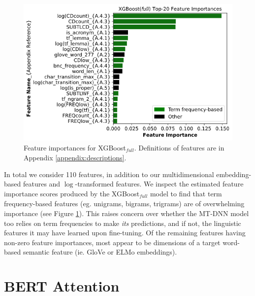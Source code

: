 \documentclass{dcthesis}
\theoremstyle{definition}
\theoremstyle{remark}
\begin{document}
\begin{figure}
  \centering
  \includegraphics[scale=0.6]{xgboost_feature_importances.png}
  \captionsetup{justification=centering}
  \caption{\label{fig:xgboost_feature_importance} Feature importances for XGBoost$_\textit{full}$. Definitions of features are in Appendix \ref{appendix:descriptions}.}
\end{figure}

In total we consider 110 features, in addition to our multidimensional embedding-based features and $\log$-transformed features. We inspect the estimated feature importance scores produced by the XGBoost$_\textit{full}$ model to find that term frequency-based features (eg. unigrams, bigrams, trigrams) are of overwhelming importance (see Figure \ref{fig:xgboost_feature_importance}). This raises concern over whether the MT-DNN model too relies on term frequencies to make \textit{its} predictions, and if not, the linguistic features it may have learned upon fine-tuning. Of the remaining features having non-zero feature importances, most appear to be dimensions of a target word-based semantic feature (ie. GloVe or ELMo embeddings).

\section{BERT Attention}
\label{sec:bert_attention}
\end{document}
